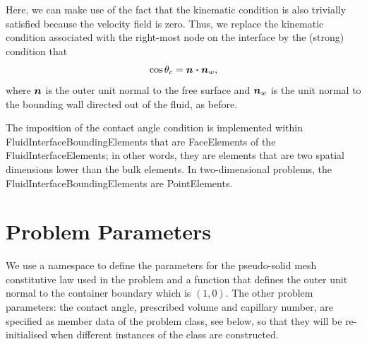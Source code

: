 Here, we can make use of the fact that the kinematic condition is also trivially satisfied because the velocity field is zero. Thus, we replace the kinematic condition associated with the right-\/most node on the interface by the (strong) condition that \[ \cos\theta_{c} = \mbox{\boldmath$n\cdot n$}_{w}, \] where $ \mbox{\boldmath$n$} $ is the outer unit normal to the free surface and $ \mbox{\boldmath$n$}_{w} $ is the unit normal to the bounding wall directed out of the fluid, as before.

The imposition of the contact angle condition is implemented within {\ttfamily Fluid\+Interface\+Bounding\+Elements} that are {\ttfamily Face\+Elements} of the {\ttfamily Fluid\+Interface\+Elements}; in other words, they are elements that are two spatial dimensions lower than the bulk elements. In two-\/dimensional problems, the {\ttfamily Fluid\+Interface\+Bounding\+Element\textquotesingle{}s} are {\ttfamily Point\+Elements}.



 

\hypertarget{index_global}{}\section{Problem Parameters}\label{index_global}
We use a namespace to define the parameters for the pseudo-\/solid mesh constitutive law used in the problem and a function that defines the outer unit normal to the container boundary which is $ (1,0) $. The other problem parameters\+: the contact angle, prescribed volume and capillary number, are specified as member data of the problem class, see below, so that they will be re-\/initialised when different instances of the class are constructed.


